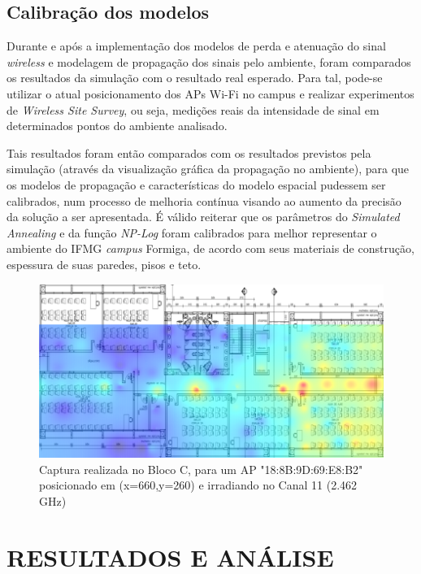 \documentclass[
	12pt,				%
	openright,			%
	twoside,			%
	a4paper,			%
	english,			%
	french,				%
	spanish,			%
	brazil				%
	]{abntex2}
\begin{document}
\section[Calibração dos modelos ]{Calibração dos modelos }

Durante e após a implementação dos modelos de perda e atenuação do sinal \textit{wireless} e modelagem de propagação dos sinais pelo ambiente, foram comparados os resultados da simulação com o resultado real esperado. Para tal, pode-se utilizar o atual posicionamento dos APs Wi-Fi no campus e realizar experimentos de \textit{Wireless Site Survey}, ou seja, medições reais da intensidade de sinal em determinados pontos do ambiente analisado.

Tais resultados foram então comparados com os resultados previstos pela simulação (através da visualização gráfica da propagação no ambiente), para que os modelos de propagação e características do modelo espacial pudessem ser calibrados, num processo de melhoria contínua visando ao aumento da precisão da solução a ser apresentada. É válido reiterar que os parâmetros do \textit{Simulated Annealing} e da função \textit{NP-Log} foram calibrados para melhor representar o ambiente do IFMG \textit{campus} Formiga, de acordo com seus materiais de construção, espessura de suas paredes, pisos e teto. 

\begin{figure}[ht]
	\caption{\label{captura}Captura realizada no Bloco C, para um AP "18:8B:9D:69:E8:B2" posicionado em (x=660,y=260) e irradiando no Canal 11 (2.462 GHz)}
	\begin{center}
		\includegraphics[scale=0.5]{images/captura.jpg}
	\end{center}
\end{figure}


\chapter[RESULTADOS E ANÁLISE]{RESULTADOS E ANÁLISE}
\end{document}
